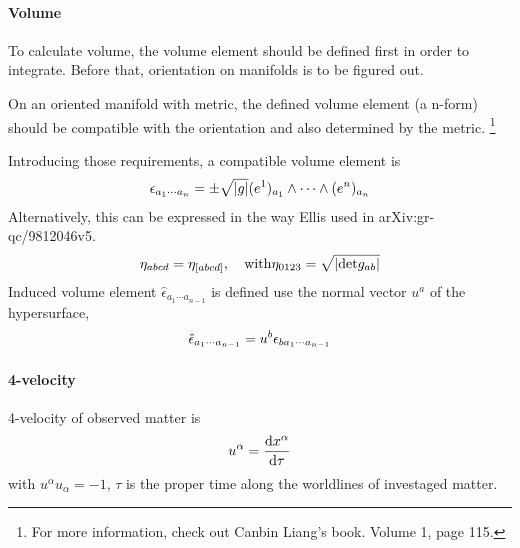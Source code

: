 \documentclass[letterpaper,10pt,english]{sphinxmanual}
\begin{document}
\paragraph{Volume}
\label{relativity/GeneralRelativity:volume}
To calculate volume, the volume element should be defined first in order to integrate. Before that, orientation on manifolds is to be figured out.

On an oriented manifold with metric, the defined volume element (a n-form) should be compatible with the orientation and also determined by the metric. \footnote{
For more information, check out Canbin Liang's book. Volume 1, page 115.
}

Introducing those requirements, a compatible volume element is
\begin{gather}
\begin{split}\epsilon_{a_1\cdots a_n} = \pm \sqrt{|g|} (e^1)_{a_1}\wedge \cdots \wedge (e^n)_{a_n}\end{split}\notag
\end{gather}
Alternatively, this can be expressed in the way Ellis used in arXiv:gr-qc/9812046v5.
\begin{gather}
\begin{split}\eta_{abcd} = \eta_{[abcd]}, \quad \mathrm{with} \eta_{0123} = \sqrt{|\mathrm {det} g_{ab}|}\end{split}\notag
\end{gather}
Induced volume element \(\hat \epsilon_{a_1\cdots a_{n-1}}\) is defined use the normal vector \(u^a\) of the hypersurface,
\begin{gather}
\begin{split}\hat \epsilon_{a_1\cdots a_{n-1}} = u^b \epsilon_{b a_1 \cdots a_{n-1}}\end{split}\notag
\end{gather}

\paragraph{4-velocity}
\label{relativity/GeneralRelativity:velocity}
4-velocity of observed matter is
\begin{gather}
\begin{split}u^\alpha = \frac{\mathrm d x^\alpha}{\mathrm d \tau}\end{split}\notag
\end{gather}
with \(u^\alpha u_\alpha =-1\), \(\tau\) is the proper time along the worldlines of investaged matter.
\end{document}
